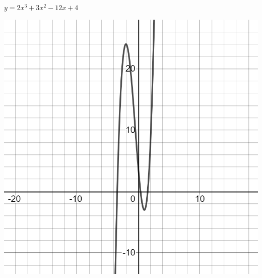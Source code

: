 \documentclass[12pt]{article}
\begin{document}
\newpage
$y=2x^{3}+3x^{2}-12x+4$

\includegraphics[scale=0.25]{desmos-graph (4).png}
\end{document}
